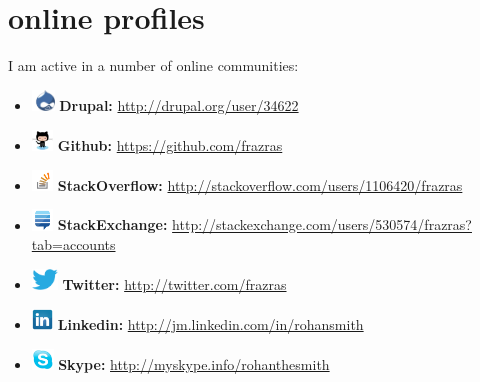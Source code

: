 \documentclass[]{friggeri-cv} %
\begin{document}

\section{online profiles}
I am active in a number of online communities:
\begin{itemize}
	\item[] \includegraphics[height=16pt]{druplicon.png} \textbf{Drupal: }\href {http://drupal.org/user/34622}{http://drupal.org/user/34622}
	\item[] \includegraphics[height=16pt]{octocat.png} \textbf{Github: }\href {https://github.com/frazras}{https://github.com/frazras}
	\item[] \includegraphics[height=16pt]{stackoverflow.png} \textbf{StackOverflow: }\href{http://stackoverflow.com/users/1106420/frazras}{http://stackoverflow.com/users/1106420/frazras}
	\item[] \includegraphics[height=16pt]{stackexchange.png} \textbf{StackExchange: } \href {http://stackexchange.com/users/530574/frazras?tab=accounts}{http://stackexchange.com/users/530574/frazras?tab=accounts}
	\item[]  \includegraphics[height=16pt]{twitter.eps}  \textbf{Twitter: }\href {http://twitter.com/frazras}{http://twitter.com/frazras}
    \item[] \includegraphics[height=16pt]{linkedin.png}  \textbf{Linkedin: }\href {http://jm.linkedin.com/in/rohansmith}{http://jm.linkedin.com/in/rohansmith}
	\item[] \includegraphics[height=16pt]{skype.png} \textbf{Skype: }\href {http://myskype.info/rohanthesmith}{http://myskype.info/rohanthesmith}
\end{itemize}
\end{document}
